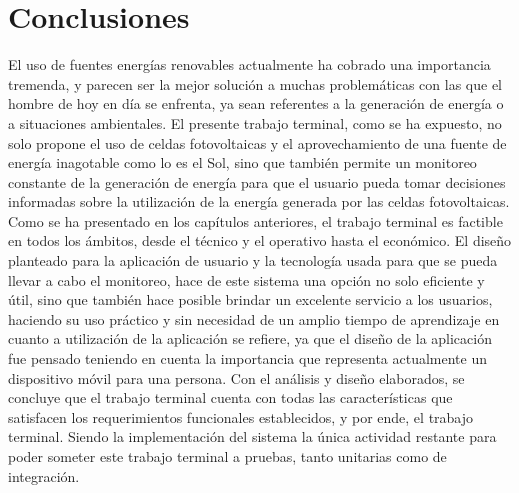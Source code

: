 \chapter{Conclusiones}\label{chapter5}
El uso de fuentes energías renovables actualmente ha cobrado una importancia tremenda, y parecen ser la mejor solución a muchas problemáticas con las que el hombre de hoy en día se enfrenta, ya sean referentes a la generación de energía o a situaciones ambientales.
\newline El presente trabajo terminal, como se ha expuesto, no solo propone el uso de celdas fotovoltaicas y el aprovechamiento de una fuente de energía inagotable como lo es el Sol, sino que también permite un monitoreo constante de la generación de energía para que el usuario pueda tomar decisiones informadas sobre la utilización de la energía generada por las celdas fotovoltaicas. Como se ha presentado en los capítulos anteriores, el trabajo terminal es factible en todos los ámbitos, desde el técnico y el operativo hasta el económico.
\newline El diseño planteado para la aplicación de usuario y la tecnología usada para que se pueda llevar a cabo el monitoreo, hace de este sistema una opción no solo eficiente y útil, sino que también hace posible brindar un excelente servicio a los usuarios, haciendo su uso práctico y sin necesidad de un amplio tiempo de aprendizaje en cuanto a utilización de la aplicación se refiere, ya que el diseño de la aplicación fue pensado teniendo en cuenta la importancia que representa actualmente un dispositivo móvil para una persona.
\newline Con el análisis y diseño elaborados, se concluye que el trabajo terminal cuenta con todas las características que satisfacen los requerimientos funcionales establecidos, y por ende, el trabajo terminal. Siendo la implementación del sistema la única actividad restante para poder someter este trabajo terminal a pruebas, tanto unitarias como de integración.


